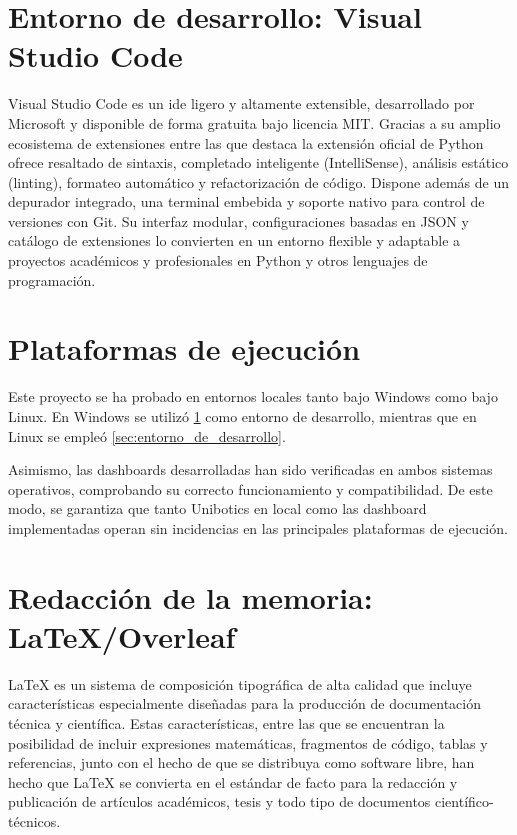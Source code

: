\documentclass[a4paper, 12pt]{book}
\begin{document}
\section{Entorno de desarrollo: Visual Studio Code}
\label{sec:entorno_de_desarrollo_vscode}

Visual Studio Code es un \gls{ide} ligero y altamente extensible, desarrollado por Microsoft y disponible de forma gratuita bajo licencia MIT. Gracias a su amplio ecosistema de extensiones entre las que destaca la extensión oficial de Python ofrece resaltado de sintaxis, completado inteligente (IntelliSense), análisis estático (linting), formateo automático y refactorización de código. Dispone además de un depurador integrado, una terminal embebida y soporte nativo para control de versiones con Git. Su interfaz modular, configuraciones basadas en JSON y catálogo de extensiones lo convierten en un entorno flexible y adaptable a proyectos académicos y profesionales en Python y otros lenguajes de programación.  

\section{Plataformas de ejecución}
\label{sec:plataformas_de_ejecucion}

Este proyecto  se ha probado en entornos locales tanto bajo Windows como bajo Linux.  
En Windows se utilizó \ref{sec:entorno_de_desarrollo_vscode} como entorno de desarrollo, mientras que en Linux se empleó \ref{sec:entorno_de_desarrollo}.

Asimismo, las dashboards desarrolladas han sido verificadas en ambos sistemas operativos, comprobando su correcto funcionamiento y compatibilidad.  
De este modo, se garantiza que tanto Unibotics en local como las dashboard implementadas operan sin incidencias en las principales plataformas de ejecución.  

\section{Redacción de la memoria: LaTeX/Overleaf}
\label{sec:redaccion_de_la_memoria}

LaTeX es un sistema de composición tipográfica de alta calidad que incluye características especialmente diseñadas para la producción de documentación técnica y científica. Estas características, entre las que se encuentran la posibilidad de incluir expresiones matemáticas, fragmentos de código, tablas y referencias, junto con el hecho de que se distribuya como software libre, han hecho que LaTeX se convierta en el estándar de facto para la redacción y publicación de artículos académicos, tesis y todo tipo de documentos científico-técnicos. 
\end{document}
